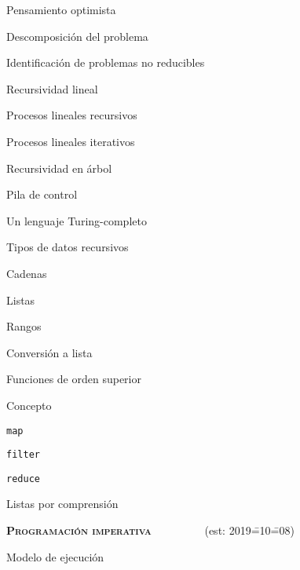 \begin{longenum}
\begin{longenum}
\begin{longenum}
\begin{longenum}
\begin{longenum}
                    \item Pensamiento optimista
                    \item Descomposición del problema
                    \item Identificación de problemas no reducibles
                \end{longenum}
                \item Recursividad lineal
                \begin{longenum}
                    \item Procesos lineales recursivos
                    \item Procesos lineales iterativos
                \end{longenum}
                \item Recursividad en árbol
            \end{longenum}
            \item Pila de control
            \item Un lenguaje Turing-completo 
        \end{longenum}
        \item Tipos de datos recursivos
        \begin{longenum}
            \item Cadenas
            \item Listas
            \item Rangos
            \item Conversión a lista
        \end{longenum}
        \item Funciones de orden superior
        \begin{longenum}
            \item Concepto
            \item \texttt{map}
            \item \texttt{filter}
            \item \texttt{reduce}
            \item Listas por comprensión
        \end{longenum}
    \end{longenum}
    \item \textbf{\textsc{Programación imperativa}} \ \ \ \ \ \ \ \ \ (est: 2019\==10\==08)
    \begin{longenum}
        \item Modelo de ejecución
        \begin{longenum}

\end{longenum}
\end{longenum}
\end{longenum}
